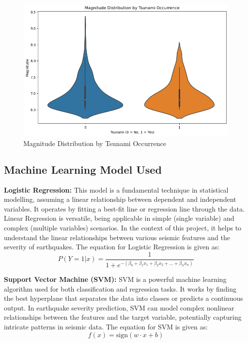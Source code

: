 \documentclass{article}
\begin{document}
\begin{figure}[H]
    \centering
    \includegraphics[width=0.899\linewidth]{Tsunami distibution.png} 
    \vspace*{-0.5cm}
    \caption{Magnitude Distribution by Tsunami Occurrence}
    \label{fig:eda}
\end{figure}

\subsection{Machine Learning Model Used}

\textbf{Logistic Regression:} This model is a fundamental technique in statistical modelling, assuming a linear relationship between dependent and independent variables. It operates by fitting a best-fit line or regression line through the data. Linear Regression is versatile, being applicable in simple (single variable) and complex (multiple variables) scenarios. In the context of this project, it helps to understand the linear relationships between various seismic features and the severity of earthquakes. The equation for Logistic Regression is given as: 
\[ P(Y=1 | x) = \frac{1}{1 + e^{-(\beta_0 + \beta_1x_1 + \beta_2x_2 + \ldots + \beta_nx_n)}} \]

\textbf{Support Vector Machine (SVM):} SVM is a powerful machine learning algorithm used for both classification and regression tasks. It works by finding the best hyperplane that separates the data into classes or predicts a continuous output. In earthquake severity prediction, SVM can model complex nonlinear relationships between the features and the target variable, potentially capturing intricate patterns in seismic data. The equation for SVM is given as: 
\[ f(x) = \text{sign}(w \cdot x + b) \]
\end{document}

